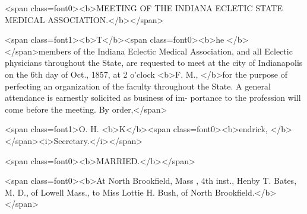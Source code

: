 <span class=font0><b>MEETING OF THE INDIANA ECLETIC STATE MEDICAL ASSOCIATION.</b></span>

<span class=font1><b>T</b><span class=font0><b>he </b></span>members of the Indiana Eclectic Medical Association, and all
Eclectic physicians throughout the State, are requested to meet at the
city of Indianapolis on the 6th day of Oct., 1857, at 2 o'clock <b>F. M.,
</b>for the purpose of perfecting an organization of the faculty throughout
the State. A general attendance is earnestly solicited as business of im-
portance to the profession will come before the meeting.   By order,</span>

<span class=font1>O. H. <b>K</b><span class=font0><b>endrick, </b></span><i>Secretary.</i></span>

<span class=font0><b>MARRIED.</b></span>

<span class=font0><b>At North Brookfield, Mass , 4th inst., Henby T. Bates, M. D., of Lowell Mass., to Miss
Lottie H. Bush, of North Brookfield.</b></span>\endinput
